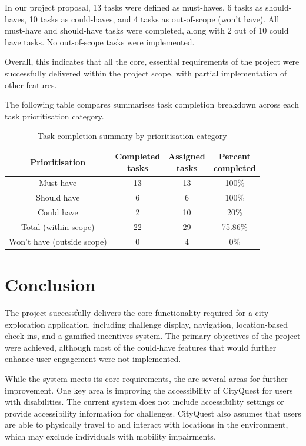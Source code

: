 \documentclass{vgtc}                          %
\begin{document}
In our project proposal, 13 tasks were defined as must-haves, 6 tasks as should-haves, 10 tasks as could-haves, and 4 tasks as out-of-scope (won't have). All must-have and should-have tasks were completed, along with 2 out of 10 could have tasks. No out-of-scope tasks were implemented.

Overall, this indicates that all the core, essential requirements of the project were successfully delivered within the project scope, with partial implementation of other features.

The following table compares summarises task completion breakdown across each task prioritisation category.

\begin{table}[htbp]
    \centering
    \begin{tabular}{|c|c|c|c|}
        \hline
        Prioritisation & 
        \makecell{Completed\\tasks} & 
        \makecell{Assigned\\tasks} & 
        \makecell{Percent\\completed} \\
        \hline
        Must have & 13 & 13 & 100\% \\
        Should have & 6 & 6 & 100\% \\
        Could have & 2 & 10 & 20\% \\
        \hline
        Total (within scope)& 22 & 29 & 75.86\% \\
        \hline
        Won't have (outside scope)& 0 & 4 & 0\% \\
        \hline
    \end{tabular}
    \caption{Task completion summary by prioritisation category}
    \label{tab:completion_summary}
\end{table}

\section{Conclusion}

The project successfully delivers the core functionality required for a city exploration application, including challenge display, navigation, location-based check-ins, and a gamified incentives system. The primary objectives of the project were achieved, although most of the could-have features that would further enhance user engagement were not implemented.

While the system meets its core requirements, the are several areas for further improvement. 
One key area is improving the accessibility of CityQuest for users with disabilities. The current system does not include accessibility settings or provide accessibility information for challenges. CityQuest also assumes that users are able to physically travel to and interact with locations in the environment, which may exclude individuals with mobility impairments.
\end{document}

